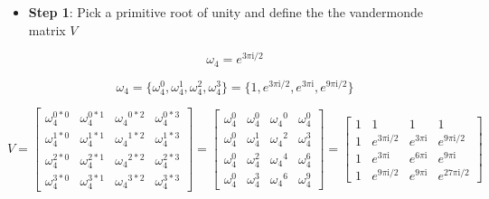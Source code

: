 \documentclass[11pt]{article}
\providecommand{\tightlist}{%
      \setlength{\itemsep}{0pt}\setlength{\parskip}{0pt}}
\begin{document}
\begin{itemize}
\tightlist
\item
  \textbf{Step 1}: Pick a primitive root of unity and define the the
  vandermonde matrix \(V\)
\end{itemize}

    \[\omega_4 = e^{{3\pi\mathrm{i}}/2}\]

\[\omega_4 = \{ \omega_4^{0}, \omega_4^{1}, \omega_4^{2}, \omega_4^{3} \} = \{ 1, e^{{3\pi\mathrm{i}}/2}, e^{3\pi\mathrm{i}}, e^{{9\pi\mathrm{i}}/2} \}\]

\[ V = 
     \begin{bmatrix}
     \omega_4^{0*0} & \omega_4^{0*1} & {\omega_4}^{0*2} & \omega_4^{0*3}
     \\ \omega_4^{1*0} & \omega_4^{1*1} & {\omega_4}^{1*2} & \omega_4^{1*3} 
     \\ \omega_4^{2*0} & \omega_4^{2*1} & {\omega_4}^{2*2} & \omega_4^{2*3} 
     \\  \omega_4^{3*0} & \omega_4^{3*1} & {\omega_4}^{3*2} & \omega_4^{3*3}
     \end{bmatrix} = 
     \begin{bmatrix} \omega_4^{0} & \omega_4^{0} & {\omega_4}^{0} & \omega_4^{0}
     \\ \omega_4^{0} & \omega_4^{1} & {\omega_4}^{2} & \omega_4^{3}
     \\ \omega_4^{0} & \omega_4^{2} & {\omega_4}^{4} & \omega_4^{6}
     \\  \omega_4^{0} & \omega_4^{3} & {\omega_4}^{6} & \omega_4^{9}
     \end{bmatrix} = 
     \begin{bmatrix} 1 & 1 & 1 & 1 
     \\ 1 & e^{{3\pi\mathrm{i}}/2} & e^{3\pi\mathrm{i}} & e^{{9\pi\mathrm{i}}/2}
     \\ 1 & e^{3\pi\mathrm{i}} & e^{6\pi\mathrm{i}} & e^{9\pi\mathrm{i}}
     \\ 1 & e^{{9\pi\mathrm{i}}/2} & e^{9\pi\mathrm{i}} & e^{{27\pi\mathrm{i}}/2}
     \end{bmatrix}\]
\end{document}
